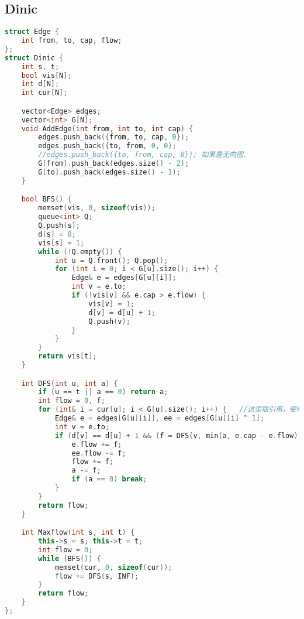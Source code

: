\subsection{Dinic}
\begin{lstlisting}[language = c++] 
struct Edge {
    int from, to, cap, flow;
};
struct Dinic {
    int s, t;
    bool vis[N];
    int d[N];
    int cur[N];

    vector<Edge> edges;
    vector<int> G[N];
    void AddEdge(int from, int to, int cap) {
        edges.push_back({from, to, cap, 0});
        edges.push_back({to, from, 0, 0); 
        //edges.push_back({to, from, cap, 0}); 如果是无向图.
        G[from].push_back(edges.size() - 2);
        G[to].push_back(edges.size() - 1);
    }

    bool BFS() {
        memset(vis, 0, sizeof(vis));
        queue<int> Q;
        Q.push(s);
        d[s] = 0;
        vis[s] = 1;
        while (!Q.empty()) {
            int u = Q.front(); Q.pop();
            for (int i = 0; i < G[u].size(); i++) {
                Edge& e = edges[G[u][i]];
                int v = e.to;
                if (!vis[v] && e.cap > e.flow) {
                    vis[v] = 1;
                    d[v] = d[u] + 1;
                    Q.push(v);
                }
            }
        }
        return vis[t];
    }

    int DFS(int u, int a) {
        if (u == t || a == 0) return a;
        int flow = 0, f;
        for (int& i = cur[u]; i < G[u].size(); i++) {   //这里取引用，使得u的当前弧被i改变，再次访问到u时，将跳过u已经访问过的支路
            Edge& e = edges[G[u][i]], ee = edges[G[u][i] ^ 1];
            int v = e.to;
            if (d[v] == d[u] + 1 && (f = DFS(v, min(a, e.cap - e.flow))) > 0) {
                e.flow += f;
                ee.flow -= f;
                flow += f;
                a -= f;
                if (a == 0) break;
            }
        }
        return flow;
    }

    int Maxflow(int s, int t) {
        this->s = s; this->t = t;
        int flow = 0;
        while (BFS()) {
            memset(cur, 0, sizeof(cur));
            flow += DFS(s, INF);
        }
        return flow;
    }
};

\end{lstlisting}